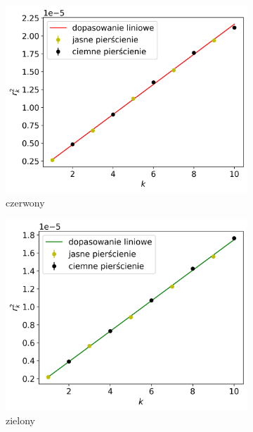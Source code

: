 \documentclass[12pt]{article}
\begin{document}
\begin{figure}[H]
	\centering
	\begin{subfigure}{0.3\textwidth}
		\includegraphics[width=\linewidth]{red}
		\caption{czerwony}
	\end{subfigure}\hfill
	\begin{subfigure}{0.3\textwidth}
		\includegraphics[width=\linewidth]{green}
		\caption{zielony}
	\end{subfigure}\hfill
	\begin{subfigure}{0.3\textwidth}

\end{subfigure}
\end{figure}
\end{document}
